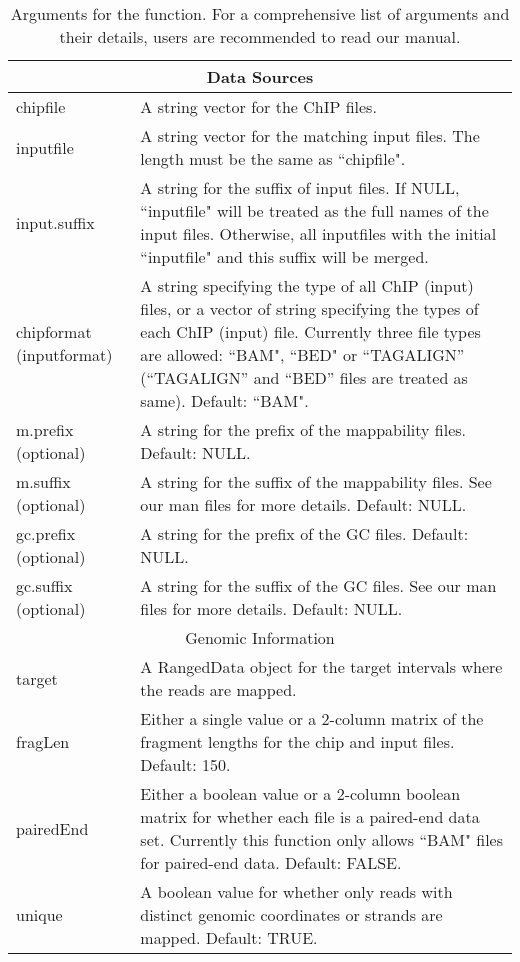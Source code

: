 \documentclass[a4paper,10pt]{article}\usepackage[]{graphicx}\usepackage[]{color}
\begin{document}
\begin{table}
  \centering
  \caption{Arguments for the  function. For a comprehensive list of arguments and their details, users are recommended to read our manual.}\label{tbl:arguments}
  \begin{tabular}{p{2cm}p{10cm}}
    \hline
    \multicolumn{2}{c}{Data Sources}\\
    \hline
    chipfile & A string vector for the ChIP files.\\
    inputfile & A string vector for the matching input files. The length must be the same as ``chipfile".\\
    input.suffix & A string for the suffix of input files. If NULL, ``inputfile" will be treated as the full names of the input files. Otherwise, all inputfiles with the initial ``inputfile" and this suffix will be merged.\\
    chipformat (inputformat) & A string specifying the type of all ChIP (input) files, or a vector of string specifying the types of each ChIP (input) file.  Currently three file types are allowed: ``BAM", ``BED" or ``TAGALIGN'' (``TAGALIGN'' and ``BED'' files are treated as same).  Default: ``BAM".\\
    m.prefix (optional) & A string for the prefix of the mappability files. Default: NULL.\\
    m.suffix (optional) & A string for the suffix of the mappability files. See our man files for more details. Default: NULL.\\
    gc.prefix (optional) & A string for the prefix of the GC files. Default: NULL.\\
    gc.suffix (optional) & A string for the suffix of the GC files.  See our man files for more details. Default: NULL.\\
    \hline
    \multicolumn{2}{c}{Genomic Information}\\
    \hline
    target & A RangedData object for the target intervals where the reads are mapped.\\
    fragLen & Either a single value or a 2-column matrix of the fragment lengths for the chip and input files.  Default: 150.\\
    pairedEnd & Either a boolean value or a 2-column boolean matrix for  whether each file is a paired-end data set. Currently this function only allows ``BAM" files for paired-end data. Default: FALSE.\\
    unique & A boolean value for whether only reads with distinct genomic coordinates or strands are mapped.  Default: TRUE.\\

\end{tabular}
\end{table}
\end{document}
